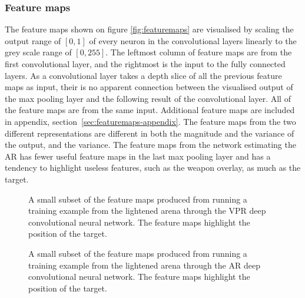 






\subsubsection{Feature maps}
\label{sec:featuremaps}
The feature maps shown on figure \ref{fig:featuremaps} are visualised by scaling the output range of $[0,1]$ of every neuron in the convolutional layers linearly to the grey scale range of $[0,255]$. The leftmost column of feature maps are from the first convolutional layer, and the rightmost is the input to the fully connected layers. As a convolutional layer takes a depth slice of all the previous feature maps as input, their is no apparent connection between the visualised output of the max pooling layer and the following result of the convolutional layer. All of the feature maps are from the same input. Additional feature maps are included in appendix, section~\ref{sec:featuremaps-appendix}. The feature maps from the two different representations are different in both the magnitude and the variance of the output, and the variance. The feature maps from the network estimating the AR has fewer useful feature maps in the last max pooling layer and has a tendency to highlight useless features, such as the weapon overlay, as much as the target.

\begin{figure}[H]
	\begin{scriptsize}
		\sffamily
		\def\svgwidth{\textwidth}
		
	\end{scriptsize}
	\caption[Feature maps]{A small subset of the feature maps produced from running a training example from the lightened arena through the VPR deep convolutional neural network. The feature maps highlight the position of the target.}
	\label{fig:featuremapsvpr}
\end{figure}

\begin{figure}[H]
	\begin{scriptsize}
		\sffamily
		\def\svgwidth{\textwidth}
		
	\end{scriptsize}
	\caption[Feature maps]{A small subset of the feature maps produced from running a training example from the lightened arena through the AR deep convolutional neural network. The feature maps highlight the position of the target.}
	\label{fig:featuremapsangular}
\end{figure}

